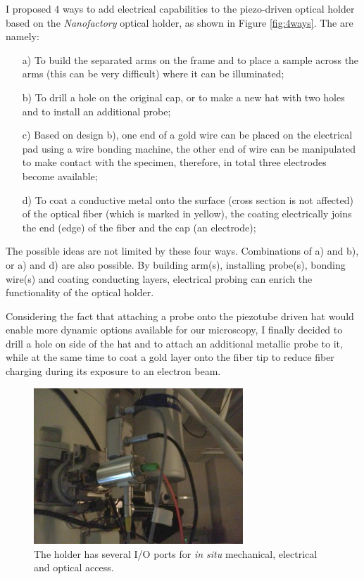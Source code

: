 I proposed 4 ways to add electrical capabilities to the piezo-driven optical holder based on the \textit{Nanofactory} optical holder, as shown in Figure \ref{fig:4ways}. 
The are namely: \\
\begin{itemize}
	\item[a)] To build the separated arms on the frame and to place a sample across the arms (this can be very difficult) where it can be illuminated; 
	\item[b)] To drill a hole on the original cap, or to make a new hat with two holes and to install an additional probe; 
	\item[c)] Based on design b), one end of a gold wire can be placed on the electrical pad using a wire bonding machine, the other end of wire can be manipulated to make contact with the specimen, therefore, in total three electrodes become available; 
	\item[d)] To coat a conductive metal onto the surface (cross section is not affected) of the optical fiber (which is marked in yellow), the coating electrically joins the end (edge) of the fiber and the cap (an electrode); 
\end{itemize}
The possible ideas are not limited by these four ways. Combinations of a) and b), or a) and d) are also possible. By building arm(s), installing probe(s), bonding wire(s) and coating conducting layers, electrical probing can enrich the functionality of the optical holder. 

Considering the fact that attaching a probe onto the piezotube driven hat would enable more dynamic options available for our microscopy, I finally decided to drill a hole on side of the hat and to attach an additional metallic probe to it, while at the same time to coat a gold layer onto the fiber tip to reduce fiber charging during its exposure to an electron beam. 

\begin{figure}  
\centering
\includegraphics[width=0.7\textwidth]{figures/figure2_holderbot}
\caption[Outside of the holder]{The holder has several I/O ports for {\em in situ} mechanical, electrical and optical access.
\label{fig:2_bot}}
\end{figure}

